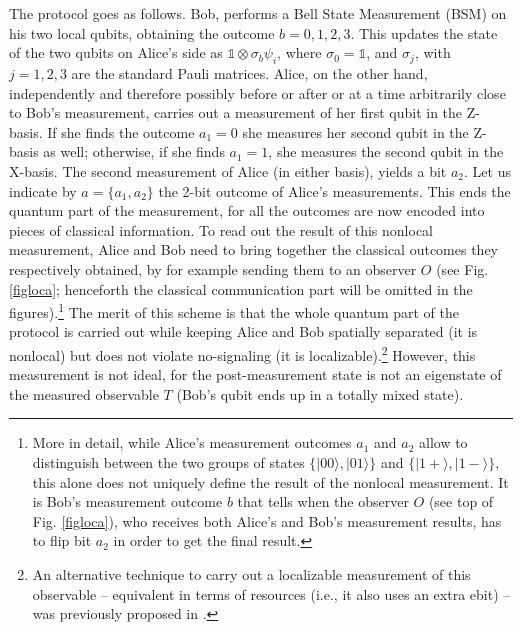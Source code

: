 \documentclass[a4paper,twocolumn,11pt,accepted=2024-02-14]{quantumarticle}
\newcommand{\ket}[1]{| {#1} \rangle} %
\begin{document}
The protocol goes as follows. Bob, performs a Bell State Measurement (BSM)  on his two local qubits, obtaining the outcome $b=0,1,2,3$. This updates the state of the two qubits on Alice's side as $\mathds{1}\otimes\sigma_b\psi_i$, where $\sigma_0=\mathds 1$, and $\sigma_j$, with $j=1, 2, 3$ are the standard Pauli matrices. Alice, on the other hand, independently and therefore possibly before or after or at a time arbitrarily close to Bob's measurement, carries out a measurement of her first qubit in the  Z-basis. If she finds the outcome $a_1=0$ she measures her second qubit in the Z-basis as well; otherwise, if she finds $a_1=1$, she measures the second qubit in the X-basis. The second measurement of Alice (in either basis), yields a bit $a_2$. Let us indicate by $a=\{a_1,a_2\}$ the 2-bit outcome of Alice's measurements.
 This ends the quantum part of the measurement, for all the outcomes are now encoded into pieces of classical information. To read out the result of this nonlocal measurement, Alice and Bob need to bring together the classical outcomes they respectively obtained, by for example sending them to an observer $O$ (see Fig. \ref{figloca}; henceforth the classical communication part will be omitted in the figures).\footnote{More in detail, while Alice’s measurement outcomes $a_1$ and $a_2$ allow to distinguish between the two groups of states $\{\ket{00},\ket{01}\}$ and  $\{\ket{1+},\ket{1-}\}$, this alone does not uniquely define the result of the nonlocal measurement. It is Bob’s measurement outcome $b$ that tells when the observer $O$ (see top of Fig. \ref{figloca}), who receives both Alice’s and Bob’s measurement results, has to flip bit $a_2$ in order to get the final result.} The merit of this scheme is that the whole quantum part of the protocol is carried out while keeping Alice and Bob spatially separated (it is nonlocal) but does not violate no-signaling (it is localizable).\footnote{An alternative technique to carry out a localizable measurement of this observable -- equivalent in terms of resources (i.e., it also uses an extra ebit) -- was previously proposed in \cite{groisman2002measurements}.} However, this measurement is not ideal, for the post-measurement state is not an eigenstate of the measured observable $T$ (Bob's qubit ends up in a totally mixed state).
\end{document}

